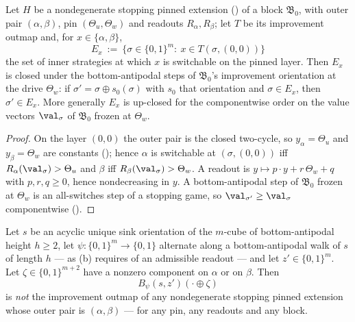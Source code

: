 \begin{lemma}\label{rs:upclosed}
Let $H$ be a nondegenerate stopping pinned extension () of a
block $\mathfrak B_0$, with outer pair $(\alpha,\beta)$, pin $(\Theta_u,\Theta_w)$
and readouts $R_\alpha,R_\beta$; let $T$ be its improvement outmap and, for
$x\in\{\alpha,\beta\}$,
\[
  E_x\ :=\ \{\sigma\in\{0,1\}^{m}:\ x\in T(\sigma,(0,0))\}
\]
the set of inner strategies at which $x$ is switchable on the pinned layer.
Then $E_x$ is closed under the bottom-antipodal steps of $\mathfrak B_0$'s
improvement orientation at the drive $\Theta_w$: if $\sigma'=\sigma\oplus
s_0(\sigma)$ with $s_0$ that orientation and $\sigma\in E_x$, then
$\sigma'\in E_x$. More generally $E_x$ is up-closed for the componentwise order
on the value vectors $\val_\sigma$ of $\mathfrak B_0$ frozen at $\Theta_w$.
\end{lemma}

\begin{proof}
On the layer $(0,0)$ the outer pair is the closed two-cycle, so $y_\alpha
=\Theta_u$ and $y_\beta=\Theta_w$ are constants (); hence
$\alpha$ is switchable at $(\sigma,(0,0))$ iff $R_\alpha(\val_\sigma)>\Theta_u$
and $\beta$ iff $R_\beta(\val_\sigma)>\Theta_w$. A readout is $y\mapsto p\cdot y
+r\,\Theta_w+q$ with $p,r,q\ge0$, hence nondecreasing in $y$. A
bottom-antipodal step of $\mathfrak B_0$ frozen at $\Theta_w$ is an
all-switches step of a stopping game, so $\val_{\sigma'}\ge\val_\sigma$
componentwise ().
\end{proof}

\begin{theorem}\label{rs:no-outer-translate}
Let $s$ be an acyclic unique sink orientation of the $m$-cube of
bottom-antipodal height $h\ge2$, let $\psi:\{0,1\}^{m}\to\{0,1\}$ alternate
along a bottom-antipodal walk of $s$ of length $h$ --- as
(b) requires of an admissible readout --- and let
$z'\in\{0,1\}^{m}$. Let $\zeta\in\{0,1\}^{m+2}$ have a nonzero component on
$\alpha$ or on $\beta$. Then
\[
  B_\psi(s,z')(\cdot\oplus\zeta)
\]
is \emph{not} the improvement outmap of any nondegenerate stopping pinned
extension whose outer pair is $(\alpha,\beta)$ --- for any pin, any readouts and
any block.
\end{theorem}

